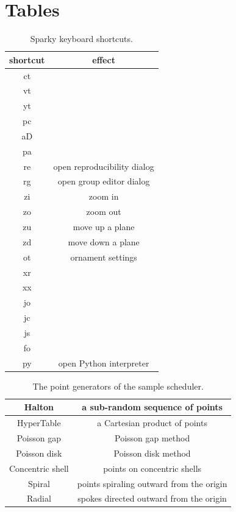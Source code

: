 \clearpage
\section{Tables}

\begin{table}[h]
  \begin{tabular}{ | c | c | }
    \hline
    shortcut    &   effect      \\  \hline
    ct      &       \\  \hline
    vt      &       \\  \hline
    yt      &       \\  \hline
    pc      &       \\  \hline
    aD      &       \\  \hline
    pa      &       \\  \hline
    re      &  open reproducibility dialog     \\  \hline
    rg      &  open group editor dialog     \\  \hline
    zi      &  zoom in     \\  \hline
    zo      &  zoom out     \\  \hline
    zu      &  move up a plane     \\  \hline
    zd      &  move down a plane     \\  \hline
    ot      &  ornament settings     \\  \hline
    xr      &       \\  \hline
    xx      &       \\  \hline
    jo      &       \\  \hline
    jc      &       \\  \hline
    js      &       \\  \hline
    fo      &       \\  \hline
    py      &  open Python interpreter  \\  \hline
  \end{tabular}
  \caption{Sparky keyboard shortcuts.}
  \label{sparky_shortcuts}
\end{table}

\begin{table}
  \begin{tabular}{ | c | c | }
    \hline
    Halton          &  a sub-random sequence of points            \\  \hline
    HyperTable      &  a Cartesian product of points              \\  \hline
    Poisson gap     &  Poisson gap method \\  \hline
    Poisson disk    &  Poisson disk method  \\  \hline
    Concentric shell & points on concentric shells               \\  \hline
    Spiral          &  points spiraling outward from the origin  \\  \hline
    Radial          &  spokes directed outward from the origin  \\  \hline
  \end{tabular}
  \caption{The point generators of the sample scheduler.}
  \label{scheduler_point_generators}
\end{table}

